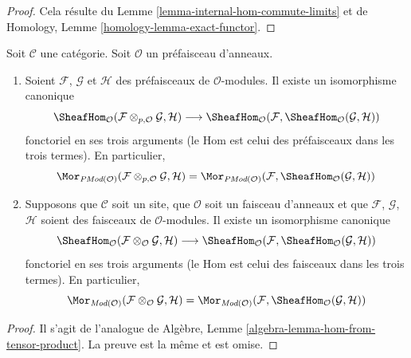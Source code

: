 \begin{proof}
Cela résulte du Lemme \ref{lemma-internal-hom-commute-limits} et de
Homology, Lemme \ref{homology-lemma-exact-functor}.
\end{proof}

\begin{lemma}
\label{lemma-internal-hom-adjoint-tensor}
Soit $\mathcal{C}$ une catégorie. Soit $\mathcal{O}$ un préfaisceau
d'anneaux.
\begin{enumerate}
\item Soient $\mathcal{F}$, $\mathcal{G}$ et $\mathcal{H}$ des préfaisceaux
de $\mathcal{O}$-modules. Il existe un isomorphisme canonique
$$
\SheafHom_\mathcal{O}
(\mathcal{F} \otimes_{p, \mathcal{O}} \mathcal{G}, \mathcal{H})
\longrightarrow
\SheafHom_\mathcal{O}
(\mathcal{F}, \SheafHom_\mathcal{O}(\mathcal{G}, \mathcal{H}))
$$
fonctoriel en ses trois arguments (le Hom est celui des préfaisceaux dans les
trois termes). En particulier,
$$
\Mor_{\textit{PMod}(\mathcal{O})}(
\mathcal{F} \otimes_{p, \mathcal{O}} \mathcal{G}, \mathcal{H})
=
\Mor_{\textit{PMod}(\mathcal{O})}(
\mathcal{F}, \SheafHom_\mathcal{O}(\mathcal{G}, \mathcal{H}))
$$
\item
Supposons que $\mathcal{C}$ soit un site, que $\mathcal{O}$ soit un faisceau
d'anneaux et que $\mathcal{F}$, $\mathcal{G}$, $\mathcal{H}$ soient des
faisceaux de $\mathcal{O}$-modules. Il existe un isomorphisme canonique
$$
\SheafHom_\mathcal{O}
(\mathcal{F} \otimes_\mathcal{O} \mathcal{G}, \mathcal{H})
\longrightarrow
\SheafHom_\mathcal{O}
(\mathcal{F}, \SheafHom_\mathcal{O}(\mathcal{G}, \mathcal{H}))
$$
fonctoriel en ses trois arguments (le Hom est celui des faisceaux dans les
trois termes). En particulier,
$$
\Mor_{\textit{Mod}(\mathcal{O})}(
\mathcal{F} \otimes_\mathcal{O} \mathcal{G}, \mathcal{H})
=
\Mor_{\textit{Mod}(\mathcal{O})}(
\mathcal{F}, \SheafHom_\mathcal{O}(\mathcal{G}, \mathcal{H}))
$$
\end{enumerate}
\end{lemma}

\begin{proof}
Il s'agit de l'analogue de
Algèbre, Lemme \ref{algebra-lemma-hom-from-tensor-product}.
La preuve est la même et est omise.
\end{proof}

